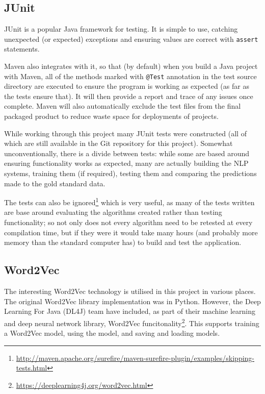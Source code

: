 \subsection*{JUnit}
JUnit is a popular Java framework for testing. It is simple to use, catching unexpected (or expected) exceptions and ensuring values are correct with \texttt{assert} statements. 

Maven also integrates with it, so that (by default) when you build a Java project with Maven, all of the methods marked with \texttt{@Test} annotation in the test source directory are executed to ensure the program is working as expected (as far as the tests ensure that). It will then provide a report and trace of any issues once complete. Maven will also automatically exclude the test files from the final packaged product to reduce waste space for deployments of projects. 

While working through this project many JUnit tests were constructed (all of which are still available in the Git repository for this project). Somewhat unconventionally, there is a divide between tests: while some are based around ensuring functionality works as expected, many are actually building the NLP systems, training them (if required), testing them and comparing the predictions made to the gold standard data.

The tests can also be ignored\footnote{\href{http://maven.apache.org/surefire/maven-surefire-plugin/examples/skipping-tests.html}{http://maven.apache.org/surefire/maven-surefire-plugin/examples/skipping-tests.html}} which is very useful, as many of the tests written are base around evaluating the algorithms created rather than testing functionality; so not only does not every algorithm need to be retested at every compilation time, but if they were it would take many hours (and probably more memory than the standard computer has) to build and test the application. 

\subsection*{Word2Vec}
The interesting Word2Vec technology is utilised in this project in various places. The original Word2Vec library implementation was in Python. However, the Deep Learning For Java (DL4J) team have included, as part of their machine learning and deep neural network library, Word2Vec funcitonality\footnote{\href{https://deeplearning4j.org/word2vec.html}{https://deeplearning4j.org/word2vec.html}}. This supports training a Word2Vec model, using the model, and saving and loading models. 

